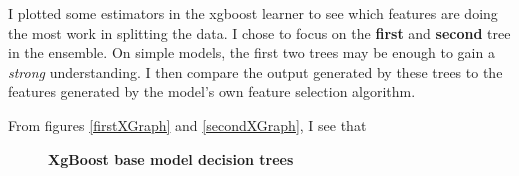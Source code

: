 I plotted some estimators in the xgboost learner to see which features are doing the most work in splitting the data. I chose to focus on the \textbf{first} and \textbf{second} tree in the ensemble. On simple models, the first two trees may be enough to gain a \textit{strong} understanding. I then compare the output generated by these trees to the features generated by the model's own feature selection algorithm. 

From figures \ref{firstXGraph} and \ref{secondXGraph}, I see that 


\begin{figure}[!hbtp]
\centering


    \caption{\textbf{XgBoost base model decision trees}}
\end{figure}


